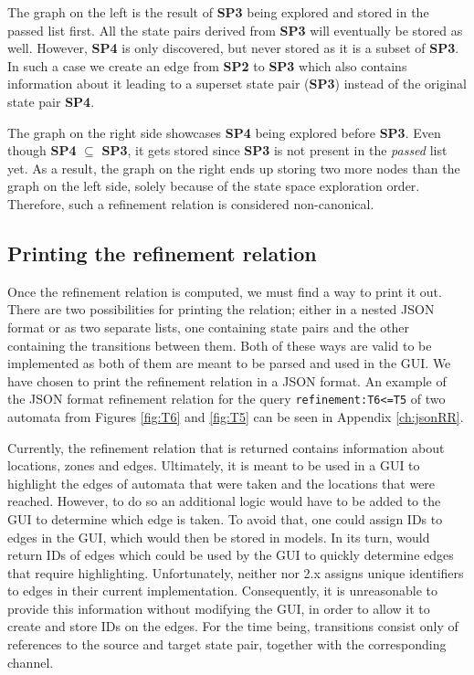 The graph on the left is the result of \textbf{SP3} being explored and stored in the passed list first. All the state pairs derived from \textbf{SP3} will eventually be stored as well. However, \textbf{SP4} is only discovered, but never stored as it is a subset of \textbf{SP3}. In such a case we create an edge from \textbf{SP2} to \textbf{SP3} which also contains information about it leading to a superset state pair (\textbf{SP3}) instead of the original state pair \textbf{SP4}.

The graph on the right side showcases \textbf{SP4} being explored before \textbf{SP3}. Even though \textbf{SP4} $\subseteq$ \textbf{SP3}, it gets stored since \textbf{SP3} is not present in the \textit{passed} list yet. As a result, the graph on the right ends up storing two more nodes than the graph on the left side, solely because of the state space exploration order. Therefore, such a refinement relation is considered non-canonical.


\subsection{Printing the refinement relation}
Once the refinement relation is computed, we must find a way to print it out. There are two possibilities for printing the relation; either in a nested JSON format or as two separate lists, one containing state pairs and the other containing the transitions between them. Both of these ways are valid to be implemented as both of them are meant to be parsed and used in the GUI. We have chosen to print the refinement relation in a JSON format. An example of the JSON format refinement relation for the query \texttt{refinement:T6<=T5} of two automata from Figures \ref{fig:T6} and \ref{fig:T5} can be seen in Appendix \ref{ch:jsonRR}.

Currently, the refinement relation that is returned contains information about locations, zones and edges. Ultimately, it is meant to be used in a GUI to highlight the edges of automata that were taken and the locations that were reached. However, to do so an additional logic would have to be added to the GUI to determine which edge is taken. To avoid that, one could assign IDs to edges in the GUI, which would then be stored in models. In its turn,  would return IDs of edges which could be used by the GUI to quickly determine edges that require highlighting. Unfortunately, neither  nor \ecdar 2.x assigns unique identifiers to edges in their current implementation. Consequently, it is unreasonable to provide this information without modifying the GUI, in order to allow it to create and store IDs on the edges. For the time being, transitions consist only of references to the source and target state pair, together with the corresponding channel. 

